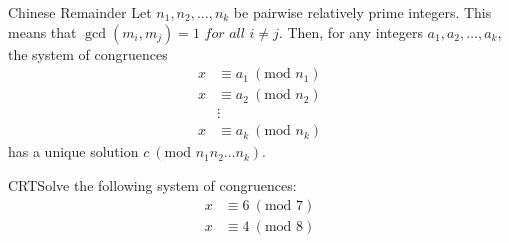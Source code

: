 \begin{theorem}
    {Chinese Remainder} Let \(n_1, n_2, \ldots, n_k\) be pairwise relatively prime integers. This means that \(\gcd(m_i,m_j) = 1 \textit{ for all } i \ne j\). Then, for any integers \(a_1, a_2, \ldots, a_k\), the system of congruences \begin{align*}
        x & \equiv a_1 \ (\text{mod } n_1) \\
        x & \equiv a_2 \ (\text{mod } n_2) \\
          & \vdots                         \\
        x & \equiv a_k \ (\text{mod } n_k)
    \end{align*} has a unique solution \(c \ (\text{mod } n_1n_2 \ldots n_k)\).
\end{theorem}

\begin{example}
    {CRT}Solve the following system of congruences: \begin{align*}
        x & \equiv 6 \ (\text{mod } 7) \\
        x & \equiv 4 \ (\text{mod } 8)
    \end{align*}
\end{example}


